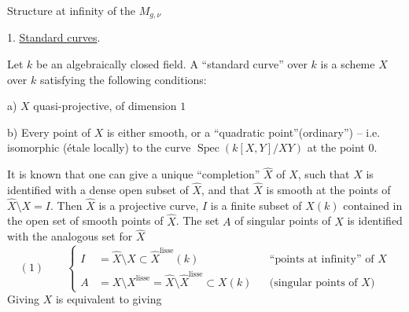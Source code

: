 Structure at infinity of the $M_{g,\nu}$

1. \uline{Standard curves}.

Let $k$ be an algebraically closed field. A ``standard curve'' over $k$ is a scheme $X$ over $k$ satisfying the following conditions:

a) $X$ quasi-projective,  of dimension $1$

b) Every point of $X$ is either smooth, or a ``quadratic point''(ordinary'') -- i.e. isomorphic (étale locally) to  the curve $\operatorname{Spec}(k[X,Y]/XY)$ at the point $0$.

It is known that one can give a unique ``completion'' $\widehat X$ of $X$, such that  $X$ is identified with a dense open subset of $\widehat X$, and that $\widehat X$ is smooth at the points of $\widehat X\setminus X=I$. Then $\widehat X$ is a projective curve, $I$ is  a finite subset of $\widehat X(k)$ contained in the open set of smooth points of $\widehat X$. The set $A$ of singular points of $X$ is identified with the analogous set for $\widehat X$
\[
(1)\qquad
\left\{\begin{aligned}
I&=\widehat X\setminus X\subset\widehat X^{\mathrm{lisse}}(k)
&&\text{``points at infinity'' of }X\\
A&=X\setminus X^{\mathrm{lisse}}=\widehat X\setminus\widehat X^{\mathrm{lisse}}\subset X(k)
&&\text{(singular points of }X\text{)}
\end{aligned}\right.
\]
Giving $X$ is equivalent to giving
